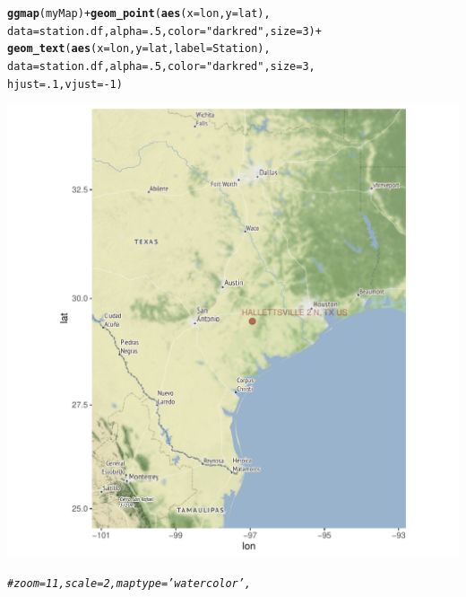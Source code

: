 \documentclass{article}\usepackage[]{graphicx}\usepackage[]{color}
\makeatletter
\def\maxwidth{ %
  \ifdim\Gin@nat@width>\linewidth
    \linewidth
  \else
    \Gin@nat@width
  \fi
}
\newcommand{\hlnum}[1]{\textcolor[rgb]{0.686,0.059,0.569}{#1}}%
\newcommand{\hlstr}[1]{\textcolor[rgb]{0.192,0.494,0.8}{#1}}%
\newcommand{\hlcom}[1]{\textcolor[rgb]{0.678,0.584,0.686}{\textit{#1}}}%
\newcommand{\hlopt}[1]{\textcolor[rgb]{0,0,0}{#1}}%
\newcommand{\hlstd}[1]{\textcolor[rgb]{0.345,0.345,0.345}{#1}}%
\newcommand{\hlkwc}[1]{\textcolor[rgb]{0.333,0.667,0.333}{#1}}%
\newcommand{\hlkwd}[1]{\textcolor[rgb]{0.737,0.353,0.396}{\textbf{#1}}}%
\newenvironment{kframe}{%
 \def\at@end@of@kframe{}%
 \ifinner\ifhmode%
  \def\at@end@of@kframe{\end{minipage}}%
  \begin{minipage}{\columnwidth}%
 \fi\fi%
 \def\FrameCommand##1{\hskip\@totalleftmargin \hskip-\fboxsep
 \colorbox{shadecolor}{##1}\hskip-\fboxsep
     \hskip-\linewidth \hskip-\@totalleftmargin \hskip\columnwidth}%
 \MakeFramed {\advance\hsize-\width
   \@totalleftmargin\z@ \linewidth\hsize
   \@setminipage}}%
 {\par\unskip\endMakeFramed%
 \at@end@of@kframe}
\newenvironment{knitrout}{}{} %
\makeatother
\begin{document}
\begin{knitrout}
\begin{kframe}
{\ttfamily\noindent\itshape\color{messagecolor}{\#\# Source : http://tile.stamen.com/terrain/7/30/54.png}}\begin{alltt}
\hlkwd{ggmap}\hlstd{(myMap)} \hlopt{+} \hlkwd{geom_point}\hlstd{(}\hlkwd{aes}\hlstd{(}\hlkwc{x} \hlstd{= lon,} \hlkwc{y} \hlstd{= lat),}
      \hlkwc{data} \hlstd{= station.df,} \hlkwc{alpha} \hlstd{=} \hlnum{.5}\hlstd{,} \hlkwc{color}\hlstd{=}\hlstr{"darkred"}\hlstd{,} \hlkwc{size} \hlstd{=} \hlnum{3}\hlstd{)} \hlopt{+}
      \hlkwd{geom_text}\hlstd{(}\hlkwd{aes}\hlstd{(}\hlkwc{x} \hlstd{= lon,} \hlkwc{y} \hlstd{= lat,} \hlkwc{label}\hlstd{=Station),}
      \hlkwc{data} \hlstd{= station.df,} \hlkwc{alpha} \hlstd{=} \hlnum{.5}\hlstd{,} \hlkwc{color}\hlstd{=}\hlstr{"darkred"}\hlstd{,} \hlkwc{size} \hlstd{=} \hlnum{3}\hlstd{,}
      \hlkwc{hjust}\hlstd{=}\hlnum{.1}\hlstd{,} \hlkwc{vjust}\hlstd{=}\hlopt{-}\hlnum{1}\hlstd{)}
\end{alltt}
\end{kframe}
\includegraphics[width=\maxwidth]{figure/unnamed-chunk-4-1} 
\begin{kframe}\begin{alltt}
\hlcom{#zoom = 11, scale = 2, maptype ='watercolor',}


\end{alltt}
\end{kframe}
\end{knitrout}
\end{document}
